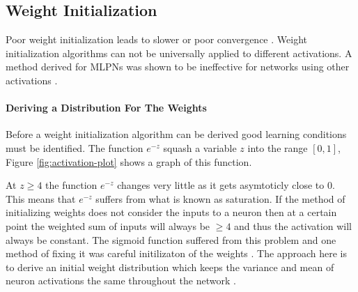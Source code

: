\subsection{Weight Initialization} \label{subsec:weight-initlization}
Poor weight initialization leads to slower or poor convergence \cite{mishkin2015all}. Weight initialization algorithms can not be universally applied to different activations. A method derived for MLPNs was shown to be ineffective for networks using other activations \cite{he2015delving}.

\paragraph{Deriving a Distribution For The Weights}
Before a weight initialization algorithm can be derived good learning conditions must be identified. The function $e^{-z}$ squash a variable $z$ into the range $[0,1]$, Figure \ref{fig:activation-plot} shows a graph of this function.\\
\noindent
\begin{minipage}[t]{0.55\textwidth}
\vspace{0px}
At $z \geq 4$ the function $e^{-z}$ changes very little as it gets asymtoticly close to 0. This means that $e^{-z}$ suffers from what is known as saturation. If the method of initializing weights does not consider the inputs to a neuron then at a certain point the weighted sum of inputs will always be $\geq 4$ and thus the activation will always be constant. The sigmoid function suffered from this problem and one method of fixing it was careful initilizaton of the weights \cite{glorot2010understanding}. The approach here is to derive an initial weight distribution which keeps the variance and mean of neuron activations the same throughout the network \cite{kumar2017weight}. \\
\end{minipage}
\hspace{0.05\textwidth}
